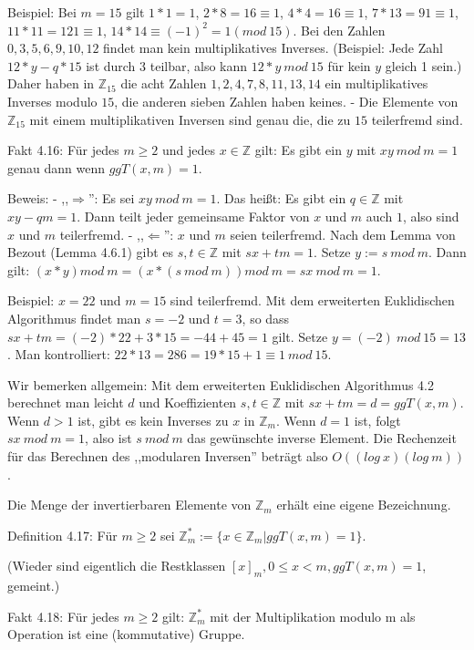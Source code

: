 \documentclass[a4paper]{article}
\begin{document}
\begin{multicols}{3}
    Beispiel: Bei $m=15$ gilt $1*1=1$, $2*8 = 16\equiv 1$, $4*4 = 16\equiv 1$, $7*13 = 91\equiv 1$, $11*11 = 121\equiv 1$, $14* 14 \equiv (-1)^2 = 1 (mod\ 15)$. Bei den Zahlen $0, 3 , 5 , 6 , 9 , 10 , 12$ findet man kein multiplikatives Inverses. (Beispiel: Jede Zahl $12*y-q*15$ ist durch $3$ teilbar, also kann $12*y\ mod\ 15$ für kein $y$ gleich 1 sein.) Daher haben in $\mathbb{Z}_{15}$ die acht Zahlen $1, 2, 4, 7, 8, 11, 13, 14$ ein multiplikatives Inverses modulo $15$, die anderen sieben Zahlen haben keines. - Die Elemente von $\mathbb{Z}_{15}$ mit einem multiplikativen Inversen sind genau die, die zu $15$ teilerfremd sind.

    Fakt 4.16: Für jedes $m\geq 2$ und jedes $x\in\mathbb{Z}$ gilt: Es gibt ein $y$ mit $xy\ mod\ m=1$ genau dann wenn $ggT(x,m)=1$.

    Beweis:
    - ,,$\Rightarrow$'': Es sei $xy\ mod\ m= 1$. Das heißt: Es gibt ein $q\in\mathbb{Z}$ mit $xy-qm=1$. Dann teilt jeder gemeinsame Faktor von $x$ und $m$ auch $1$, also sind $x$ und $m$ teilerfremd.
    - ,,$\Leftarrow$'': $x$ und $m$ seien teilerfremd. Nach dem Lemma von Bezout (Lemma 4.6.1) gibt es $s,t\in\mathbb{Z}$ mit $sx+tm=1$. Setze $y:=s\ mod\ m$. Dann gilt: $(x*y) mod\ m= (x*(s\ mod\ m)) mod\ m=sx\ mod\ m= 1$.

    Beispiel: $x=22$ und $m=15$ sind teilerfremd. Mit dem erweiterten Euklidischen Algorithmus findet man $s=-2$ und $t=3$, so dass $sx+tm=(-2)*22 + 3*15 =-44 + 45 = 1$ gilt. Setze $y=(-2)\ mod\ 15 = 13$. Man kontrolliert: $22*13 =286=19 *15 + 1\equiv 1\ mod\ 15$.

    Wir bemerken allgemein: Mit dem erweiterten Euklidischen Algorithmus 4.2 berechnet man leicht $d$ und Koeffizienten $s,t\in\mathbb{Z}$ mit $sx+tm= d= ggT(x,m)$. Wenn $d>1$ ist, gibt es kein Inverses zu $x$ in $\mathbb{Z}_m$. Wenn $d=1$ ist, folgt $sx\ mod\ m=1$, also ist $s\ mod\ m$ das gewünschte inverse Element. Die Rechenzeit für das Berechnen des ,,modularen Inversen'' beträgt also $O((log\ x)(log\ m))$.

    Die Menge der invertierbaren Elemente von $\mathbb{Z}_m$ erhält eine eigene Bezeichnung.

    Definition 4.17: Für $m\geq 2$ sei $\mathbb{Z}^*_m:=\{x\in\mathbb{Z}_m| ggT(x,m)=1\}$.

    (Wieder sind eigentlich die Restklassen $[x]_m, 0\leq x < m, ggT(x,m) = 1$, gemeint.)

    Fakt 4.18: Für jedes $m\geq 2$ gilt: $\mathbb{Z}^*_m$ mit der Multiplikation modulo m als Operation ist eine (kommutative) Gruppe.


\end{multicols}
\end{document}
